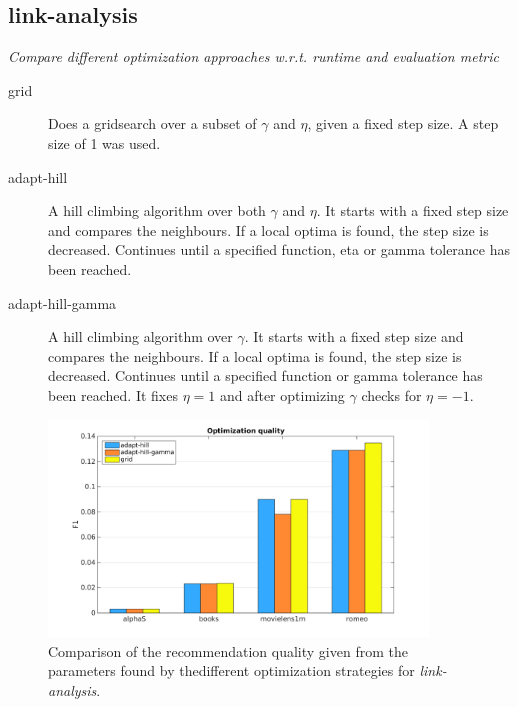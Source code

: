 
\subsection{link-analysis}

\textit{Compare different optimization approaches w.r.t. runtime and evaluation metric}

\begin{description}
    \item[grid]
        Does a gridsearch over a subset of $\gamma$ and $\eta$, given a fixed step size. A step size of 1 was used.
    \item[adapt-hill]
        A hill climbing algorithm over both $\gamma$ and $\eta$. It starts with a fixed step size and compares the neighbours. If a local optima is found, the step size is decreased. Continues until a specified function, eta or gamma tolerance has been reached.
    \item[adapt-hill-gamma]
        A hill climbing algorithm over $\gamma$. It starts with a fixed step size and compares the neighbours. If a local optima is found, the step size is decreased. Continues until a specified function or gamma tolerance has been reached. It fixes $\eta = 1$ and after optimizing $\gamma$ checks for $\eta = -1$.
\end{description}


\begin{figure}[h!]
    \centering
    \includegraphics[width=0.9\textwidth]{fig/comp/comp_link_quality.png}
    \caption{Comparison of the recommendation quality given from the parameters found by thedifferent optimization strategies for \textit{link-analysis}.}
\end{figure}

